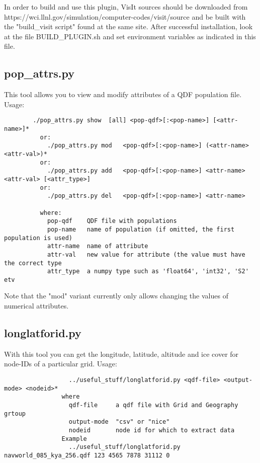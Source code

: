   In order to build and use this plugin, VisIt sources should be downloaded from https://wci.llnl.gov/simulation/computer-codes/visit/source and be built with the "build_visit script" found at the same site.
  After successful installation, look at the file {\selectfont BUILD_PLUGIN.sh} and set environment variables as indicated in this file.


\subsection{pop_attrs.py}
This tool allows you to view and modify attributes of a QDF population file.
	Usage:
		\begin{lstlisting}
	    ./pop_attrs.py show  [all] <pop-qdf>[:<pop-name>] [<attr-name>]*
          or:
            ./pop_attrs.py mod   <pop-qdf>[:<pop-name>] (<attr-name> <attr-val>)*
          or:
            ./pop_attrs.py add   <pop-qdf>[:<pop-name>] <attr-name> <attr-val> [<attr_type>]
          or:
            ./pop_attrs.py del   <pop-qdf>[:<pop-name>] <attr-name>
          
          where:
            pop-qdf    QDF file with populations
            pop-name   name of population (if omitted, the first population is used)
            attr-name  name of attribute
            attr-val   new value for attribute (the value must have the correct type
            attr_type  a numpy type such as 'float64', 'int32', 'S2' etv

		\end{lstlisting}
Note that the "mod" variant currently only allows changing the values of numerical attributes.


\subsection{longlatforid.py}
With this tool you can get the longitude, latitude, altitude and ice cover for node-IDs of a particular grid.
     Usage:
		\begin{lstlisting}
                  ../useful_stuff/longlatforid.py <qdf-file> <output-mode> <nodeid>* 
                where
                  qdf-file     a qdf file with Grid and Geography grtoup
                  output-mode  "csv" or "nice"
                  nodeid       node id for which to extract data
                Example
                  ../useful_stuff/longlatforid.py  navworld_085_kya_256.qdf 123 4565 7878 31112 0
		\end{lstlisting}